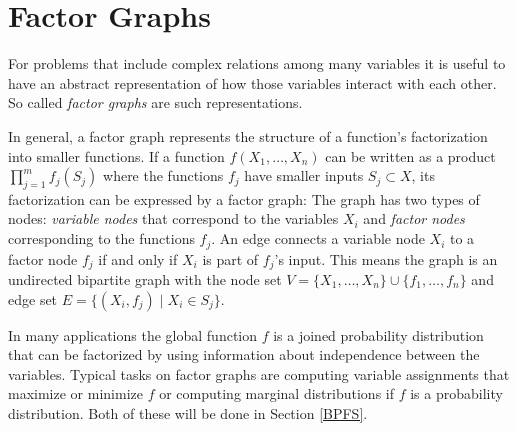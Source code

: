 \section{Factor Graphs}

For problems that include complex relations among many variables it is useful to have an abstract representation of how those	variables interact with each other. So called \emph{factor graphs} are such representations.\newline

In general, a factor graph represents the structure of a function's factorization into smaller functions. \newline If a function $f(X_1, \ldots, X_n)$ can be written as a product $\prod_{j=1}^{m}{f_j(S_j)}$  where the functions $f_j$ have smaller inputs $S_j \subset X$, its factorization 
can be expressed by a factor graph: The graph has two types of nodes: 
\emph{variable nodes} that correspond to the variables $X_i$ and \emph{factor nodes} corresponding to the functions $f_j$. An edge connects a variable node $X_i$ to a factor node $f_j$ if and only if $X_i$ is part of $f_j$'s input. 
This means the graph is an undirected bipartite graph with the node set $ V = \{X_1, \ldots, X_n\} \cup \{f_1, \ldots, f_n\}$ and edge set $E = \{(X_i, f_j) \; | \; X_i \in S_j\}$. 

In many applications the global function $f$ is a joined probability distribution that can be factorized by using information about independence between the variables. Typical tasks on factor graphs are computing variable assignments that maximize or minimize $f$ or computing marginal distributions if $f$ is a probability distribution. Both of these will be done in Section \ref{BPFS}.

